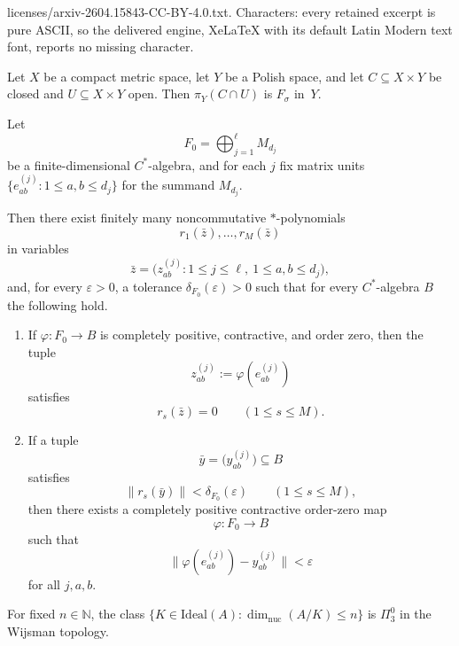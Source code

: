 \documentclass[10pt,a4paper]{amsart}
\newcommand{\Ideal}{\mathrm{Ideal}}
\newcommand{\N}{\mathbb{N}}
\renewcommand{\le}{\leqslant}
\begin{document}
licenses/arxiv-2604.15843-CC-BY-4.0.txt. Characters: every retained excerpt is pure ASCII, so the delivered engine, XeLaTeX with its default Latin Modern text font, reports no missing character.
\begin{lemma}\label{lem:proj-locally-closed}
Let $X$ be a compact metric space, let $Y$ be a Polish space, and let $C\subseteq X\times Y$ be closed and $U\subseteq X\times Y$ open.  Then $\pi_Y(C\cap U)$ is $F_\sigma$ in~$Y$.
\end{lemma}

\begin{lemma}
\label{lem:order-zero-coding}
Let
\[
F_0=\bigoplus_{j=1}^{\ell} M_{d_j}
\]
be a finite-dimensional $C^*$-algebra, and for each $j$ fix matrix units
$\{e_{ab}^{(j)}:1\le a,b\le d_j\}$ for the summand $M_{d_j}$.

Then there exist finitely many noncommutative $*$-polynomials
\[
r_1(\bar z),\dots,r_M(\bar z)
\]
in variables
\[
\bar z=\bigl(z_{ab}^{(j)}:1\le j\le \ell,\ 1\le a,b\le d_j\bigr),
\]
and, for every $\varepsilon>0$, a tolerance $\delta_{F_0}(\varepsilon)>0$ such that for
every $C^*$-algebra $B$ the following hold.

\begin{enumerate}
\item If $\varphi:F_0\to B$ is completely positive, contractive, and order zero, then the
tuple
\[
z_{ab}^{(j)}:=\varphi(e_{ab}^{(j)})
\]
satisfies
\[
r_s(\bar z)=0\qquad (1\le s\le M).
\]

\item If a tuple
\[
\bar y=\bigl(y_{ab}^{(j)}\bigr)\subseteq B
\]
satisfies
\[
\|r_s(\bar y)\|<\delta_{F_0}(\varepsilon)\qquad (1\le s\le M),
\]
then there exists a completely positive contractive order-zero map
\[
\varphi:F_0\to B
\]
such that
\[
\|\varphi(e_{ab}^{(j)})-y_{ab}^{(j)}\|<\varepsilon
\]
for all $j,a,b$.
\end{enumerate}
\end{lemma}

\begin{proposition}\label{prop:nucdim}
For fixed $n\in\N$, the class
$\{K\in\Ideal(A):\dim_{\mathrm{nuc}}(A/K)\le n\}$ is $\Pi^0_3$
in the Wijsman topology.
\end{proposition}
\end{document}
